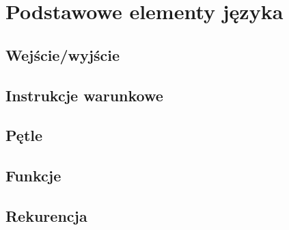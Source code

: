 \chapter{Podstawowe elementy języka}

\section{Wejście/wyjście}

\section{Instrukcje warunkowe}

\section{Pętle}

\section{Funkcje}

\section{Rekurencja}
